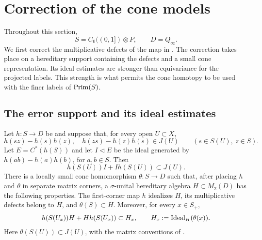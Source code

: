 \section{Correction of the cone models}
\label{cc:section}

Throughout this section,
\[
 S=C_0((0,1])\otimes P,\qquad D=Q_\infty.
\]
We first correct the multiplicative defects of the map in
.  The correction takes place on a hereditary
support containing the defects and a small cone representation.
Its ideal estimates are stronger than equivariance for the projected
labels.  This strength is what permits the cone homotopy to be used
with the finer labels of $\operatorname{Prim}(S)$.

\subsection{The error support and its ideal estimates}

\begin{lemma}\label{cc:defect-support}
Let $h:S\to D$ be \cpc and suppose that, for every open $U\subset X$,
\begin{equation}\label{cc:mixed-defects}
 h(sz)-h(s)h(z),\quad h(zs)-h(z)h(s)\in J(U)
 \qquad(s\in S(U),\ z\in S).
\end{equation}
Let $E=C^*(h(S))$ and let $I\lhd E$ be the ideal generated by
$h(ab)-h(a)h(b)$, for $a,b\in S$.  Then
\begin{equation}\label{cc:annihilation}
 h(S(U))I+Ih(S(U))\subset J(U).
\end{equation}
There is a locally small cone homomorphism $\theta:S\to D$ such that,
after placing $h$ and $\theta$ in separate matrix corners, a
$\sigma$-unital hereditary algebra $H\subset M_2(D)$ has the following
properties.  The first-corner map $h$ idealizes $H$, its multiplicative
defects belong to $H$, and $\theta(S)\subset H$.  Moreover, for every
$x\in S_+$,
\begin{equation}\label{cc:strong-support}
 h(S(U_x))H+Hh(S(U_x))\subset H_x,
 \qquad H_x:=\operatorname{Ideal}_H(\theta(x)).
\end{equation}
Here $\theta(S(U))\subset J(U)$, with the matrix conventions of
.
\end{lemma}

